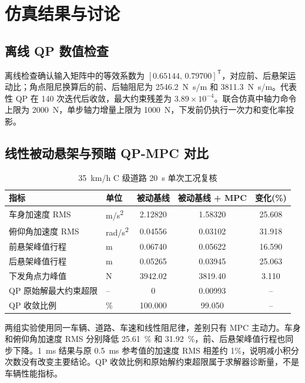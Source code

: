 \documentclass[UTF8,12pt,a4paper,fontset=windows]{ctexart}
\newcommand{\trans}{^{\mathsf T}}
\begin{document}
\section{仿真结果与讨论}

\subsection{离线 QP 数值检查}

离线检查确认输入矩阵中的等效系数为 $[0.65144,\,0.79700]\trans$，对应前、后悬架运动比；角点阻尼换算后的前、后轴阻尼为 \SI{2546.2}{N.s/m} 和 \SI{3811.3}{N.s/m}。代表性 QP 在 140 次迭代后收敛，最大约束残差为 $3.89\times10^{-4}$。联合仿真中轴力命令上限为 \SI{2000}{N}，单步轴力增量上限为 \SI{1000}{N}，下发前仍执行一次力和变化率投影。

\subsection{线性被动悬架与预瞄 QP-MPC 对比}

\begin{table}[H]
\centering
\caption{\SI{35}{km/h} C 级道路 \SI{20}{s} 单次工况复核}
\begin{tabularx}{\linewidth}{X l S[table-format=4.5] S[table-format=4.5] S[table-format=2.3]}
\toprule
指标 & 单位 & {被动基线} & {被动基线 + MPC} & {变化(\%)}\\
\midrule
车身加速度 RMS & \si{m/s^2} & 2.12820 & 1.58320 & 25.608\\
俯仰角加速度 RMS & \si{rad/s^2} & 0.04556 & 0.03102 & 31.918\\
前悬架峰值行程 & \si{m} & 0.06740 & 0.05622 & 16.590\\
后悬架峰值行程 & \si{m} & 0.05265 & 0.03945 & 25.063\\
下发角点力峰值 & \si{N} & 3942.02 & 3819.40 & 3.110\\
QP 原始解最大约束超限 & -- & 0 & 0.00993 & {--}\\
QP 收敛比例 & \si{\percent} & 100.000 & 99.050 & {--}\\
\bottomrule
\end{tabularx}
\end{table}

两组实验使用同一车辆、道路、车速和线性阻尼律，差别只有 MPC 主动力。车身和俯仰角加速度 RMS 分别降低 \SI{25.61}{\percent} 和 \SI{31.92}{\percent}，前、后悬架峰值行程也同步下降。\SI{1}{ms} 结果与原 \SI{0.5}{ms} 参考值的加速度 RMS 相差约 1\%，说明减小积分次数没有改变主要结论。QP 收敛比例和原始解约束超限属于求解器诊断量，不是车辆性能指标。
\end{document}
